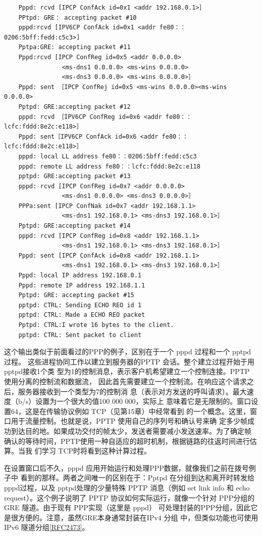 \begin{verbatim}
    Pppd: rcvd [IPCP ConfAck id=0x1 <addr 192.168.0.1>］
    PPtpd: GRE： accepting packet #10
    pppd:rcvd [IPV6CP ConfAck id=0x1 <addr fe80：：0206:5bff:fedd:c5c3>]
    Pptpa:GRE: accepting packet #11
    Pppd:rcvd [IPCP ConfReg id=0x5 <addr 0.0.0.0>
                <ms-dns1 0.0.0.0> <ms-wins 0.0.0.0>
                <ms-dns3 0.0.0.0> <ms-wins 0.0.0.0>］
    Pppd: sent ［IPCP ConfRej id=0x5 <ms-wins 0.0.0.0><ms-wins 0.0.0.0>
    Pptpd: GRE:accepting packet #12
    pppd: rcvd ［IPV6CP ConfReg id=0x6 <addr fe80：：lcfc:fddd:8e2c:e118>］
    Pppd: sent［IPV6CP ConfAck id=0x6 <addr fe80：：lcfc:fddd:8e2c:e118>］
    pppd: local LL address fe80：：0206:5bff:fedd:c5c3
    pppd: remote LL address fe80：：lcfc:fddd:8e2c:e118
    pptpd: GRE:accepting packet #13
    pppd: rcvd [IPCP ConfReg id=0x7 <addr 0.0.0.0>
                <ms-dns1 0.0.0.0> <ms-dns3 0.0.0.0>］
    PPPa:sent [IPCP ConfNak id=0x7 <addr 192.168.1.1>
                <ms-dns1 192.168.0.1> <ms-dns3 192.168.0.1>］
    Pptpd: GRE:accepting packet #14
    pppd: rcvd [IPCP ConfReg id=0x8 <addr 192.168.1.1>
                <ms-dns1 192.168.0.1> <ms-dns3 192.168.0.1>］
    Pppd: sent [IPCP ConfAck id=0x8 <addr 192.168.1.1>
                <ms-dns1 192.168.0.1> <ms-dns3 192.168.0.1>］
    Pppd: local IP address 192.168.0.1
    Pppd: remote IP address 192.168.1.1
    Pptpd: GRE: accepting packet #15
    pptpd: CTRL: Sending ECHO REO id 1
    pptpd: CTRL: Made a ECHO REO packet
    Pptpd: CTRL:I wrote 16 bytes to the client.
    pptpd: CTRL: Sent packet to client
\end{verbatim}

这个输出类似于前面看过的PPP的例子，区别在于一个 pppd 过程和一个 pptpd 过程。
这些进程协同工作以建立到服务器的PPTP 会话。整个建立过程开始于用pptpd接收1个类
型为1的控制消息，表示客户机希望建立一个控制连接。PPTP 使用分离的控制流和数据流，
因此首先需要建立一个控制流。在响应这个请求之后，服务器接收到一个类型为7的控制消
息（表示对方发送的呼叫请求）。最大速度（b/s）设置为一个很大的值100 000 000，实际上
意味着它是无限制的。窗口设置64，这是在传输协议例如 TCP（见第15章）中经常看到
的一个概念。这里，窗口用于流量控制。也就是说，PPTP 使用自己的序列号和确认号来确
定多少帧成功到达目的地。如果成功交付的帧太少，发送者需要减小发送速率。为了确定帧
确认的等待时间，PPTP使用一种自适应的超时机制，根据链路的往返时间进行估算。当我
们学习 TCP时将看到这种计算过程。

在设置窗口后不久，pppd 应用开始运行和处理PPP数据，就像我们之前在拨号例子中
看到的那样。两者之间唯一的区别在于：Pptpd 在分组到达和离开时转发给 pppd过程，以及
pptpd处理的少量特殊 PPTP 消息（例如 set link info 和 echo request）。这个例子说明了 PPTP
协议如何实际运行，就像一个针对 PPP分组的GRE 隧道。由于现有 PPP实现（这里是 pppd）
可处理封装的PPP分组，因此它是很方便的。注意，虽然GRE本身通常封装在IPv4 分组
中，但类似功能也可使用IPv6 隧道分组\href{https://www.rfc-editor.org/rfc/rfc2473}{[RFC2473]}。

